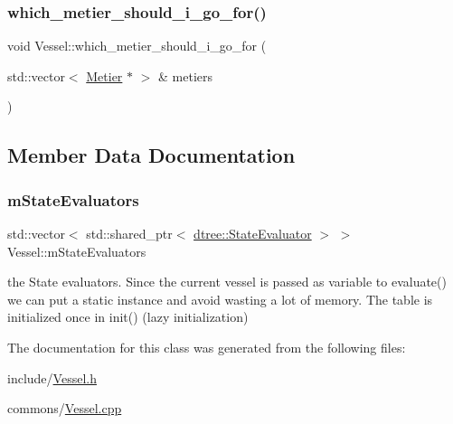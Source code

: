 \mbox{\label{class_vessel_a55d8cc09a432108987440f83a1366852}} 
\subsubsection{\texorpdfstring{which\_metier\_should\_i\_go\_for()}{which\_metier\_should\_i\_go\_for()}}
{\footnotesize\ttfamily void Vessel\+::which\+\_\+metier\+\_\+should\+\_\+i\+\_\+go\+\_\+for (\begin{DoxyParamCaption}\item[{std\+::vector$<$ \mbox{\hyperlink{class_metier}{Metier}} $\ast$ $>$ \&}]{metiers }\end{DoxyParamCaption})}



\subsection{Member Data Documentation}
\mbox{\label{class_vessel_aac9f97d33be32668e1fd5a5f39b8c84f}} 
\subsubsection{\texorpdfstring{mStateEvaluators}{mStateEvaluators}}
{\footnotesize\ttfamily std\+::vector$<$ std\+::shared\+\_\+ptr$<$ \mbox{\hyperlink{classdtree_1_1_state_evaluator}{dtree\+::\+State\+Evaluator}} $>$ $>$ Vessel\+::m\+State\+Evaluators\hspace{0.3cm}{\ttfamily [static]}}



the State evaluators. Since the current vessel is passed as variable to evaluate() we can put a static instance and avoid wasting a lot of memory. The table is initialized once in init() (lazy initialization) 



The documentation for this class was generated from the following files\+:\begin{DoxyCompactItemize}
\item 
include/\mbox{\hyperlink{_vessel_8h}{Vessel.\+h}}\item 
commons/\mbox{\hyperlink{_vessel_8cpp}{Vessel.\+cpp}}\end{DoxyCompactItemize}
